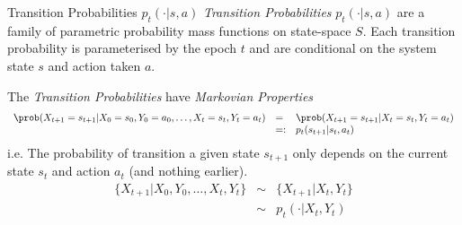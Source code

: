 \documentclass[11pt,a4paper]{article}
\begin{document}
  \begin{definition}{Transition Probabilities $p_t(\cdot|s,a)$}
    \textit{Transition Probabilities} $p_t(\cdot|s,a)$ are a family of parametric probability mass functions on state-space $S$. Each transition probability is parameterised by the epoch $t$ and are conditional on the system state $s$ and action taken $a$.
    \par The \textit{Transition Probabilities} have \textit{Markovian Properties}
    \[\begin{array}{rll}
      \prob(X_{t+1}=s_{t+1}|X_0=s_0,Y_0=a_0,\dots,X_t=s_t,Y_t=a_t)&=&\prob(X_{t+1}=s_{t+1}|X_t=s_t,Y_t=a_t)\\
      &=:&p_t(s_{t+1}|s_t,a_t)
    \end{array}\]
    i.e. The probability of transition a given state $s_{t+1}$ only depends on the current state $s_t$ and action $a_t$ (and nothing earlier).
    \[\begin{array}{rcl}
      \{X_{t+1}|X_0,Y_0,\dots,X_t,Y_t\}&\sim&\{X_{t+1}|X_t,Y_t\}\\
      &\sim&p_t(\cdot|X_t,Y_t)
    \end{array}\]
  \end{definition}
\end{document}
